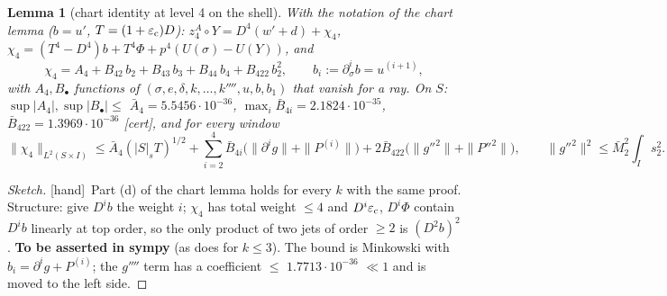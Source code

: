 \documentclass[11pt]{article}
\newtheorem{lemma}{Lemma}\newtheorem{proposition}{Proposition}\newtheorem{remark}{Remark}
\newcommand{\fn}[1]{\texttt{\detokenize{#1}}}
\newcommand{\tC}{\textup{[cert]}}\newcommand{\tH}{\textup{[hand]}}\newcommand{\tE}{\textup{[est]}}\newcommand{\tS}{\textup{[sym]}}
\begin{document}
\begin{lemma}[chart identity at level 4 on the shell]\label{F:lem:chart4}
With the notation of the chart lemma ($b=u'$, $T=(1+\varepsilon_{\rm c})D$): $z^A_4\circ Y=D^4(w'+d)+\chi_4$, $\chi_4=(T^4-D^4)b+T^4\Phi+p^4(U(\sigma)-U(Y))$, and
\[\chi_4=A_4+B_{42}\,b_2+B_{43}\,b_3+B_{44}\,b_4+B_{422}\,b_2^2,\qquad b_i:=\partial_\sigma^ib=u^{(i+1)},\]
with $A_4,B_\bullet$ functions of $(\sigma,e,\delta,k,\dots,k'''',u,b,b_1)$ that vanish for a ray. On $S$: $\sup|A_4|,\sup|B_\bullet|\le$ $\bar A_4=5.5456\cdot10^{-36}$, $\max_i\bar B_{4i}=2.1824\cdot10^{-35}$, $\bar B_{422}=1.3969\cdot10^{-36}$ \tC, and for every window
\[\|\chi_4\|_{L^2(S\times I)}\le\bar A_4(|S|_sT)^{1/2}+\sum_{i=2}^4\bar B_{4i}\bigl(\|\partial^ig\|+\|P^{(i)}\|\bigr)+2\bar B_{422}\bigl(\|g''^2\|+\|P''^2\|\bigr),\qquad\|g''^2\|^2\le\bar M_2^2\int_Is_2^2 .\]
\end{lemma}
\begin{proof}[Sketch]\tH\ Part (d) of the chart lemma holds for every $k$ with the same proof. Structure: give $D^ib$ the weight $i$; $\chi_4$ has total weight $\le4$ and $D^i\varepsilon_{\rm c}$, $D^i\Phi$ contain $D^ib$ linearly at top order, so the only product of two jets of order $\ge2$ is $(D^2b)^2$. \textbf{To be asserted in sympy} (as \fn{n1_chart.py} does for $k\le3$). The bound is Minkowski with $b_i=\partial^ig+P^{(i)}$; the $g''''$ term has a coefficient $\le$ \ensuremath{1.7713\cdot10^{-36}} $\ll1$ and is moved to the left side.
\end{proof}
\end{document}
